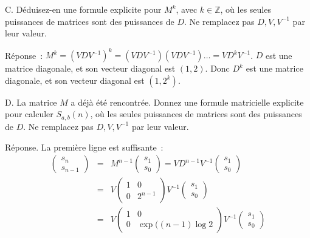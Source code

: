 \documentclass[11pt]{article}
\def\Z{\mathbb Z}
\begin{document}
C. Déduisez-en une formule explicite pour $M^k$, avec $k\in \Z$,
où les seules puissances de matrices sont des puissances de $D$.
Ne remplacez pas $D, V, V^{-1}$ par leur valeur.

Réponse~: $M^k= (VDV^{-1})^k = (VDV^{-1})(VDV^{-1})\ldots = VD^kV^{-1}$.
$D$ est une matrice diagonale, et son vecteur diagonal est $(1, 2)$. Donc $D^k$ est une matrice diagonale, et son vecteur diagonal est $(1, 2^k)$.



D. La matrice $M$ a déjà été rencontrée. Donnez une formule matricielle explicite pour calculer $S_{a,b}(n)$, où les seules puissances de matrices sont des puissances de $D$.
Ne remplacez pas $D, V, V^{-1}$ par leur valeur.

Réponse.  La première ligne est suffisante~:
\begin{eqnarray*}
\left( \begin{array}{c}
s_n \\
s_{n-1} \end{array} \right) & = & M ^{n-1} \left( \begin{array}{c}
s_1 \\
s_0 \end{array} \right) = V D^{n-1} V^{-1} \left( \begin{array}{c}
s_1 \\
s_0 \end{array} \right) \\
&=&
V\left( \begin{array}{cc}
1 & 0 \\
0 & 2 ^{n-1}\end{array} \right) V^{-1}  \left( \begin{array}{c}
s_1 \\
s_0 \end{array} \right)  \\
&=&
V\left( \begin{array}{cc}
1 & 0 \\
0 & \exp( (n-1)\log 2 \end{array} \right) V^{-1}  \left( \begin{array}{c}
s_1 \\
s_0 \end{array} \right)
\end{eqnarray*}
\end{document}
